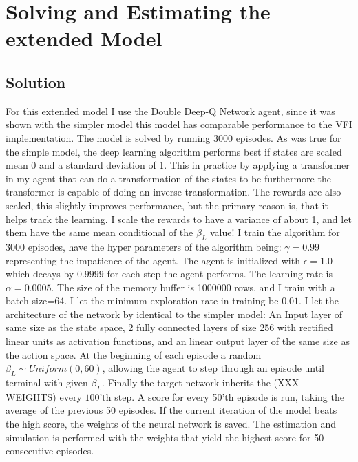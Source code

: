 \section{Solving and Estimating the extended Model}

\subsection{Solution}

For this extended model I use the Double Deep-Q Network agent, since it was shown with the simpler model this model has comparable performance to the VFI implementation. The model is solved by running 3000 episodes. As was true for the simple model, the deep learning algorithm performs best if states are scaled mean 0 and a standard deviation of 1. This in practice by applying a transformer in my agent that can do a transformation of the states to be furthermore the transformer is capable of doing an inverse transformation. The rewards are also scaled, this slightly improves performance, but the primary reason is, that it helps track the learning. I scale the rewards to have a variance of about 1, and let them have the same mean conditional of the $\beta_L$  value! I train the algorithm for 3000 episodes, have the hyper parameters of the algorithm being: $\gamma=0.99$ representing the impatience of the agent. The agent is initialized with $\epsilon=1.0$ which decays by $0.9999$ for each step the agent performs. The learning rate is $\alpha=0.0005$. The size of the memory buffer is 1000000 rows, and I train with a batch size=64. I let the minimum exploration rate in training be $0.01$. I let the architecture of the network by identical to the simpler model: An Input layer of same size as the state space, 2 fully connected layers of size 256 with rectified linear units as activation functions, and an linear output layer of the same size as the action space. At the beginning of each episode a random $\beta_L \sim Uniform(0, 60)$, allowing the agent to step through an episode until terminal with given $\beta_L$. Finally the target network inherits the (XXX WEIGHTS) every $100$'th step. A score for every 50'th episode is run, taking the average of the previous 50 episodes. If the current iteration of the model beats the high score, the weights of the neural network is saved. The estimation and simulation is performed with the weights that yield the highest score for 50 consecutive episodes. 

